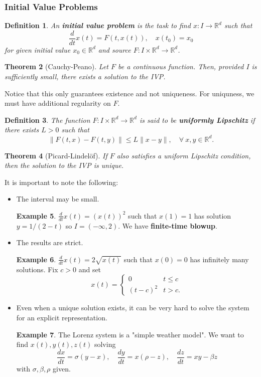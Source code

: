 \documentclass{article}
\newtheorem{theorem}{Theorem}[subsection] %
\newtheorem{definition}[theorem]{Definition}
\theoremstyle{definition}
\newtheorem{example}[theorem]{Example}
\theoremstyle{definition}
\newcommand{\R}{\mathbb{R}}
\begin{document}
\subsubsection{Initial Value Problems}
\begin{definition}
    An \textbf{initial value problem} is the task to find $x:I\to \R^d$ such that
    $$\frac{d}{dt}x(t)=F(t,x(t)),\quad x(t_0)=x_0$$
    for given initial value $x_0\in \R^d$ and source $F:I\times \R^d\to \R^d$.
\end{definition}
\begin{theorem}[Cauchy-Peano]
    Let $F$ be a continuous function. Then, provided $I$ is sufficiently small, there exists a solution to the IVP.
\end{theorem}
Notice that this only guarantees existence and not uniqueness. For uniquness, we must have additional regularity on $F$.
\begin{definition}
    The function $F:I\times \R^d\to \R^d$ is said to be \textbf{uniformly Lipschitz} if there exists $L>0$ such that
    $$\|F(t,x)-F(t,y)\|\leq L\|x-y\|,\quad \forall\:x,y\in \R^d.$$
\end{definition}
\begin{theorem}[Picard-Lindelöf]
    If $F$ also satisfies a uniform Lipschitz condition, then the solution to the IVP is unique.
\end{theorem}
It is important to note the following:
\begin{itemize}
    \item The interval may be small.
    \begin{example}
    $\frac{d}{dt}x(t)=(x(t))^2$ such that $x(1)=1$ has solution $y=1/(2-t)$ so $I=(-\infty,2)$. We have \textbf{finite-time blowup}.
    \end{example}
    \item The results are strict.
    \begin{example}
    $\frac{d}{dt}x(t)=2\sqrt{x(t)}$ such that $x(0)=0$ has infinitely many solutions. Fix $c>0$ and set
    $$x(t)=\begin{cases}
        0&t\leq c\\
        (t-c)^2&t>c.
    \end{cases}$$
    \end{example}
    \item Even when a unique solution exists, it can be very hard to solve the system for an explicit representation.
    \begin{example}
        The Lorenz system is a "simple weather model". We want to find $x(t),y(t),z(t)$ solving
        $$\frac{dx}{dt}=\sigma(y-x),\quad \frac{dy}{dt}=x(\rho-z),\quad \frac{dz}{dt}=xy-\beta z$$
        with $\sigma,\beta,\rho$ given.
    \end{example}
\end{itemize}
\end{document}
